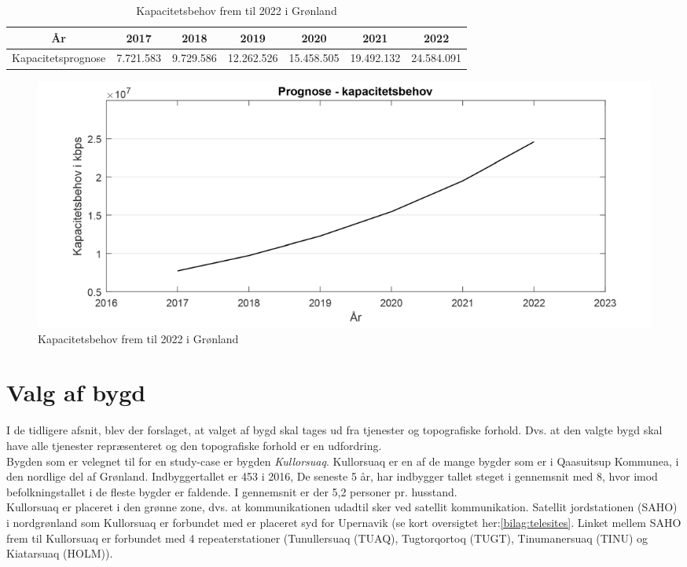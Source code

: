 \begin{table}
	\centering
    \begin{tabular}{|c|c|c|c|c|c|c|}
    \hline
    År                 & 2017      & 2018      & 2019       & 2020       & 2021       & 2022       \\ \hline
    Kapacitetsprognose & 7.721.583 & 9.729.586 & 12.262.526 & 15.458.505 & 19.492.132 & 24.584.091 \\ \hline
    \end{tabular}
    \caption{Kapacitetsbehov frem til 2022 i Grønland}
    \label{tab:kapacitetPrognose}
\end{table}
\begin{figure}
	\centering
	\includegraphics[width=1\textwidth]{figure/kapacitetsbehov.pdf}
	\caption{Kapacitetsbehov frem til 2022 i Grønland}
	\label{fig:kapacitetsbehov}
\end{figure}

\section{Valg af bygd}\label{sec:valgAfBygd}
I de tidligere afsnit, blev der forslaget, at valget af bygd skal tages ud fra tjenester og topografiske forhold. Dvs. at den valgte bygd skal have alle tjenester repræsenteret og den topografiske forhold er en udfordring.\\
Bygden som er velegnet til for en study-case er bygden \textit{Kullorsuaq}. Kullorsuaq er en af de mange bygder som er i Qaasuitsup Kommunea, i den nordlige del af Grønland. Indbyggertallet er 453 i 2016\cite{grlStatBefolkning}, De seneste 5 år, har indbygger tallet steget i gennemsnit med 8, hvor imod befolkningstallet i de fleste bygder er faldende. I gennemsnit er der 5,2 personer pr. husstand\cite{qaasuitsoqKullorsuaq}.\\
Kullorsuaq er placeret i den grønne zone, dvs. at kommunikationen udadtil sker ved satellit kommunikation. Satellit jordstationen (SAHO) i nordgrønland som Kullorsuaq er forbundet med er placeret syd for Upernavik (se kort oversigtet her:\ref{bilag:telesites}. Linket mellem SAHO frem til Kullorsuaq er forbundet med 4 repeaterstationer (Tunullersuaq (TUAQ), Tugtorqortoq (TUGT), Tinumanersuaq (TINU) og Kiatarsuaq (HOLM)).\\

